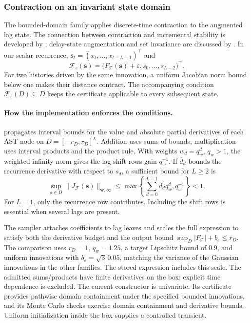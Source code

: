 \subsubsection{Contraction on an invariant state domain}
\label{sec:implemented-domain-contraction}

The bounded-domain family applies discrete-time contraction to the augmented
lag state. The connection between contraction and incremental stability is
developed by \citet{tran2019convergence}; delay-state augmentation and set
invariance are discussed by \citet{laraba2016setinvariance}. In our scalar
recurrence, $\mathbf{s}_t=(x_t,\ldots,x_{t-L+1})^\top$ and
\begin{equation}
 \mathcal F_\varepsilon(\mathbf{s})=
 \bigl(F_{\mathcal T}(\mathbf{s})+\varepsilon,
       s_0,\ldots,s_{L-2}\bigr)^\top.
 \label{eq:implemented-state-transition}
\end{equation}
For two histories driven by the same innovation, a uniform Jacobian norm
bound below one makes their distance contract. The accompanying condition
$\mathcal F_\varepsilon(D)\subseteq D$ keeps the certificate applicable to
every subsequent state.

\paragraph{How the implementation enforces the conditions.}
 propagates interval bounds for
the value and absolute partial derivatives of each AST node on
$D=[-r_D,r_D]^L$. Addition uses sums of bounds; multiplication uses interval
products and the product rule. With weights $w_d=q_w^d$, $q_w>1$, the
weighted infinity norm gives the lag-shift rows gain $q_w^{-1}$. If
$\overline d_d$ bounds the recurrence derivative with respect to $s_d$, a
sufficient bound for $L\geq2$ is
\begin{equation}
 \sup_{\mathbf{s}\in D}\|J_{\mathcal F}(\mathbf{s})\|_{\mathbf w,\infty}
 \leq\max\left\{\sum_{d=0}^{L-1}\overline d_d q_w^d,
                       q_w^{-1}\right\}<1.
 \label{eq:implemented-weighted-contraction}
\end{equation}
For $L=1$, only the recurrence row contributes. Including the shift rows is
essential when several lags are present.

The sampler attaches coefficients to lag leaves and scales the full expression
to satisfy both the derivative budget and the output bound
$\sup_D|F_{\mathcal T}|+b_\varepsilon\leq r_D$. The comparison uses
$r_D=1$, $q_w=1.25$, a target Lipschitz bound of 0.9, and uniform innovations
with $b_\varepsilon=\sqrt{3}\,0.05$, matching the variance of the Gaussian
innovations in the other families. The stored expression includes this scale.
The admitted sums/products have finite derivatives on the box; explicit time
dependence is excluded. The current constructor is univariate. Its certificate
provides pathwise domain containment under the specified bounded innovations,
and its Monte Carlo checks exercise domain containment and derivative bounds.
Uniform initialization inside the box supplies a controlled transient.
